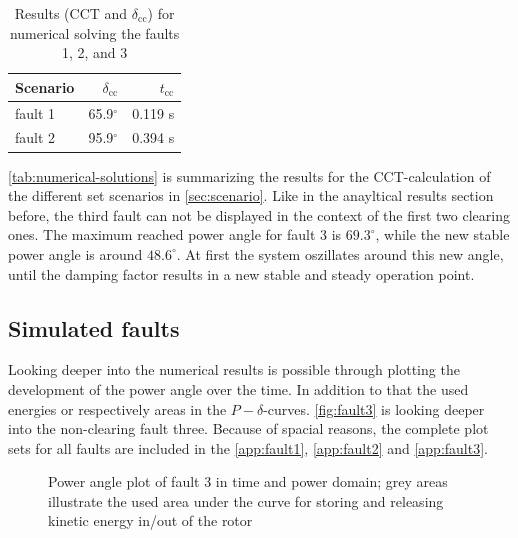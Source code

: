 \begin{table}
        \vspace{-12pt}
        \small
        \centering
        \caption[Numerical results for \acs{CCT}-calculations]{Results (\acs{CCT} and $\delta_\mathrm{cc}$) for numerical solving the faults 1, 2, and 3}
        \label{tab:numerical-solutions}
        \vspace{12pt}
        \begin{tabular}{|l|r|r|}
                \hline
                \rowcolor{lightgray} Scenario & $\delta_\mathrm{cc}$ & $t_\mathrm{cc}$ \\ \hline \hline
                fault 1                       & 65.9$^\circ$          & 0.119 s                     \\ \hline
                fault 2                       & 95.9$^\circ$          & 0.394 s                     \\ \hline
        \end{tabular}
\end{table}
\autoref{tab:numerical-solutions} is summarizing the results for the \acs{CCT}-calculation of the different set scenarios in \autoref{sec:scenario}. Like in the anayltical results section before, the third fault can not be displayed in the context of the first two clearing ones. The maximum reached power angle for fault 3 is $69.3^\circ$, while the new stable power angle is around $48.6^\circ$. At first the system oszillates around this new angle, until the damping factor results in a new stable and steady operation point.

\subsection{Simulated faults}

Looking deeper into the numerical results is possible through plotting the development of the power angle over the time. In addition to that the used energies or respectively areas in the $P-\delta$-curves. \autoref{fig:fault3} is looking deeper into the non-clearing fault three. Because of spacial reasons, the complete plot sets for all faults are included in the \autoref{app:fault1}, \autoref{app:fault2} and \autoref{app:fault3}.

\begin{figure}[H]
        \centering
        
        \caption[Power angle plot of fault 3]{Power angle plot of fault 3 in time and power domain; grey areas illustrate the used area under the curve for storing and releasing kinetic energy in/out of the rotor}
        \label{fig:fault3}
\end{figure}

